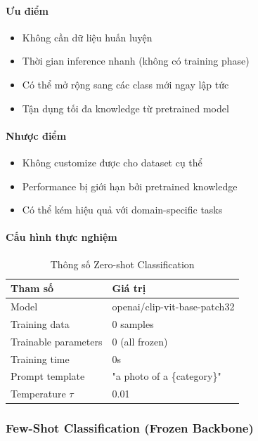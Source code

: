 \paragraph{Ưu điểm}
\begin{itemize}
    \item Không cần dữ liệu huấn luyện
    \item Thời gian inference nhanh (không có training phase)
    \item Có thể mở rộng sang các class mới ngay lập tức
    \item Tận dụng tối đa knowledge từ pretrained model
\end{itemize}

\paragraph{Nhược điểm}
\begin{itemize}
    \item Không customize được cho dataset cụ thể
    \item Performance bị giới hạn bởi pretrained knowledge
    \item Có thể kém hiệu quả với domain-specific tasks
\end{itemize}

\paragraph{Cấu hình thực nghiệm}
\begin{table}[H]
    \centering
    \caption{Thông số Zero-shot Classification}
    \begin{tabular}{|l|l|}
        \hline
        \textbf{Tham số} & \textbf{Giá trị} \\
        \hline
        Model & openai/clip-vit-base-patch32 \\
        \hline
        Training data & 0 samples \\
        \hline
        Trainable parameters & 0 (all frozen) \\
        \hline
        Training time & 0s \\
        \hline
        Prompt template & "a photo of a \{category\}" \\
        \hline
        Temperature $\tau$ & 0.01 \\
        \hline
    \end{tabular}
    \label{tab:zero-shot-config}
\end{table}

\subsubsection{Few-Shot Classification (Frozen Backbone)}\label{subsubsec:few-shot}

